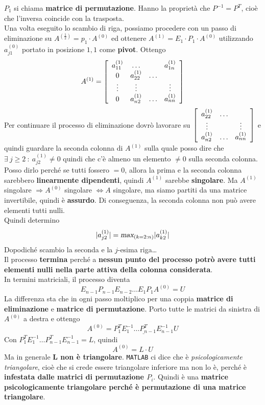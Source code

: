 \documentclass[10pt]{book}
\begin{document}
$P_1$ si chiama \textbf{matrice di permutazione}. Hanno la proprietà che $P^{-1} = P^{T}$, cioè che l'inversa coincide con la trasposta.\\
Una volta eseguito lo scambio di riga, possiamo procedere con un passo di eliminazione su $A^{(\frac{1}{2})} = p_1\cdot A^{(0)}$ ed ottenere $A^{(1)} = E_1\cdot P_1\cdot A^{(0)}$ utilizzando $a_{j1}^{(0)}$ portato in posizione $1, 1$ come \textbf{pivot}. Ottengo
$$A^{(1)} = \left[
\begin{array}{c c c c}
a_{11}^{(1)} & \ldots & & a_{1n}^{(1)} \\
0 & a_{22}^{(1)} & \ldots\\
\vdots & \vdots & & \vdots\\
0 & a_{n2}^{(1)} & \ldots & a_{nn}^{(1)}
\end{array}
\right]$$
Per continuare il processo di eliminazione dovrò lavorare su $\left[
\begin{array}{c c c}
a_{22}^{(1)} & \ldots\\
\vdots & & \vdots\\
a_{n2}^{(1)} & \ldots & a_{nn}^{(1)}
\end{array}
\right]$ e quindi guardare la seconda colonna di $A^{(1)}$ sulla quale posso dire che $\exists\: j \geq 2\: : \: a_{j2}^{(1)} \neq 0$ quindi che c'è almeno un elemento $\neq 0$ sulla seconda colonna. Posso dirlo perché se tutti fossero $= 0$, allora la prima e la seconda colonna sarebbero \textbf{linearmente dipendenti}, quindi $A^{(1)}$ sarebbe \textbf{singolare}. Ma $A^{(1)}$ singolare $\Rightarrow A^{(0)}$ singolare $\Leftrightarrow A$ singolare, ma siamo partiti da una matrice invertibile, quindi è \textbf{assurdo}. Di conseguenza, la seconda colonna non può avere elementi tutti nulli.\\
Quindi determino $$|a_{j2}^{(1)}| = \textsl{max}_{(k = 2:n)}|a_{k2}^{(1)}|$$
Dopodiché scambio la seconda e la $j$-esima riga\ldots\\
Il processo \textbf{termina} perché a \textbf{nessun punto del processo potrò avere tutti elementi nulli nella parte attiva della colonna considerata}.\\
In termini matriciali, il processo diventa
$$E_{n-1}P_{n-1}E_{n-2}\ldots E_1P_1A^{(0)} = U$$
La differenza sta che in ogni passo moltiplico per una coppia \textbf{matrice di eliminazione} e \textbf{matrice di permutazione}. Porto tutte le matrici da sinistra di $A^{(0)}$ a destra e ottengo
$$A^{(0)} = \underline{P^T_1E^{-1}_1 \ldots P^T_{n-1}E^{-1}_{n-1}} U$$
Con $P^T_1E^{-1}_1 \ldots P^T_{n-1}E^{-1}_{n-1} = L$, quindi
$$A^{(0)} = L\cdot U$$
Ma in generale \textbf{L non è triangolare}. \texttt{MATLAB} ci dice che è \textit{psicologicamente triangolare}, cioè che si crede essere triangolare inferiore ma non lo è, perché è \textbf{infestata dalle matrici di permutazione $P_i$}. Quindi è una \textbf{matrice psicologicamente triangolare perché è permutazione di una matrice triangolare}.
\end{document}
